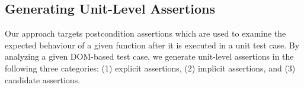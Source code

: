 \subsection{Generating Unit-Level Assertions} \label{Sec:unitLevelAssertion}
Our approach targets postcondition assertions which are used to examine the expected behaviour of a given function after it is executed in a unit test case.
By analyzing a given DOM-based test case, we generate unit-level assertions in the following three categories: (1) explicit assertions, (2) implicit assertions, and (3) candidate assertions. 



 